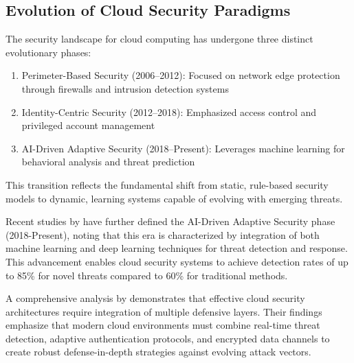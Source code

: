 \documentclass[a4paper,12pt]{article}
\begin{document}
\subsection{Evolution of Cloud Security Paradigms}
The security landscape for cloud computing has undergone three distinct evolutionary phases:
\begin{enumerate}
    \item Perimeter-Based Security (2006--2012): Focused on network edge protection through firewalls and intrusion detection systems
    \item Identity-Centric Security (2012--2018): Emphasized access control and privileged account management
    \item AI-Driven Adaptive Security (2018--Present): Leverages machine learning for behavioral analysis and threat prediction
\end{enumerate}
This transition reflects the fundamental shift from static, rule-based security models to dynamic, learning systems capable of evolving with emerging threats.

Recent studies by \citet{belal2022} have further defined the AI-Driven Adaptive Security phase (2018-Present), noting that this era is characterized by integration of both machine learning and deep learning techniques for threat detection and response. This advancement enables cloud security systems to achieve detection rates of up to 85\% for novel threats compared to 60\% for traditional methods.

A comprehensive analysis by \citet{alouffi2021} demonstrates that effective cloud security architectures require integration of multiple defensive layers. Their findings emphasize that modern cloud environments must combine real-time threat detection, adaptive authentication protocols, and encrypted data channels to create robust defense-in-depth strategies against evolving attack vectors.
\end{document}
